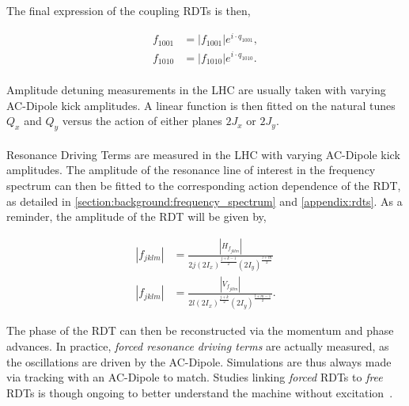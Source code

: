 The final expression of the coupling RDTs is then,

\begin{equation}
    \begin{aligned}
        f_{1001} &= |f_{1001}|e^{i\cdot q_{1001}},\\
        f_{1010} &= |f_{1010}|e^{i\cdot q_{1010}}.
    \end{aligned}
\end{equation}


\paragraph{}
Amplitude detuning measurements in the LHC are usually taken with varying AC-Dipole kick amplitudes.
A linear function is then fitted on the natural tunes $Q_x$ and $Q_y$ versus the action of either
planes $2J_x$ or $2J_y$.


\paragraph{}
Resonance Driving Terms are measured in the LHC with varying AC-Dipole kick amplitudes. The
amplitude of the resonance line of interest in the frequency spectrum can then be fitted to the
corresponding action dependence of the RDT, as detailed in
\cref{section:background:frequency_spectrum} and \cref{appendix:rdts}. As a reminder, the amplitude
of the RDT will be given by,

\begin{equation}
    \begin{aligned}
    |f_{jklm}| &= \frac{|H_{f_{jklm}}|}{2 j (2 I_x)^\frac{j+k-1}{2} (2 I_y)^\frac{l+m}{2}} \\
    |f_{jklm}| &= \frac{|V_{f_{jklm}}|}{2 l (2 I_x)^\frac{j+k}{2} (2 I_y)^\frac{l+m-1}{2}} .
    \end{aligned}
    \nonumber
\end{equation}

The phase of the RDT can then be reconstructed via the momentum and phase advances. In practice,
\textit{forced resonance driving terms} are actually measured, as the oscillations are driven by
the AC-Dipole. Simulations are thus always made via tracking with an AC-Dipole to match.
Studies linking \textit{forced} RDTs to \textit{free} RDTs is though ongoing to better understand
the machine without excitation~\cite{carlier_nonlinear_2020}.


